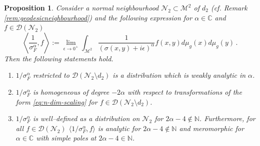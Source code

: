 \documentclass[a4paper,10pt,twoside]{article}
\numberwithin{equation}{section}
\newcounter{and}
\def\bbC{\mathbb{C}}
\def\bbN{\mathbb{N}}
\def\M{\mathcal{M}}
\def\N{\mathcal{N}}
\def\D{\mathcal{D}}
\theoremstyle{plain}
\newtheorem{propo}[theo]{Proposition}
\theoremstyle{definition}
\begin{document}
\begin{propo}\label{pr:sigma-1}
Consider a normal neighbourhood $\N_2\subset\M^2$ of $d_2$ (cf. Remark \ref{rem:geodesicneighbourhood})
and the following expression for $\alpha\in \mathbb{C}$ and $f\in \D(\N_2)$ 
\[
\left\langle \frac{1}{\sigma^\alpha_F}, f \right\rangle := \lim_{\epsilon\to0^+ } \int_{\M^2} \frac{1}{(\sigma(x,y)+i\epsilon)^{\alpha}} f(x,y)  d\mu_g (x) d\mu_g (y)\,.
\]
Then the following statements hold.
\begin{enumerate}
\item $1/{\sigma^\alpha_F}$ restricted to $\D(\N_2\setminus d_2)$ is a distribution which is weakly analytic in $\alpha$.
\item $1/{\sigma^\alpha_F}$ is homogeneous of degree $-2\alpha$ with respect to transformations of the form \eqref{eq:n-dim-scaling} for $f\in \D(\N_2\setminus d_2)$.
\item $1/{\sigma^\alpha_F}$ is well--defined as a distribution on $\N_2$ for $2\alpha-4\notin \mathbb{N}$. 
Furthermore, for all $f\in\D(\N_2)$ $\langle 1/{\sigma^\alpha_F},f\rangle$  is analytic for $2\alpha-4\notin \bbN$ and meromorphic for $\alpha \in \bbC$ with simple poles at $2\alpha-4\in \mathbb{N}$. 
\end{enumerate}
\end{propo}
\end{document}
